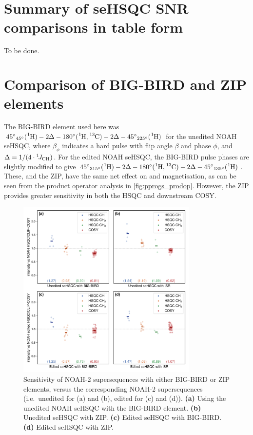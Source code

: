 \section{Summary of seHSQC SNR comparisons in table form}

To be done.

\section{Comparison of BIG-BIRD and ZIP elements}

The BIG-BIRD element used here was ${45^\circ}_{45^\circ}(\proton{}) - 2\Delta - 180^\circ(\proton{},\carbon{}) - 2\Delta - {45^\circ}_{225^\circ}(\proton{})$ for the unedited NOAH seHSQC, where $\beta_\phi$ indicates a hard pulse with flip angle $\beta$ and phase $\phi$, and $\Delta = 1/(4\cdot\onejch)$.
For the edited NOAH seHSQC, the BIG-BIRD pulse phases are slightly modified to give ${45^\circ}_{315^\circ}(\proton{}) - 2\Delta - 180^\circ(\proton{},\carbon{}) - 2\Delta - {45^\circ}_{135^\circ}(\proton{})$.
These, and the ZIP, have the same net effect on  and  magnetisation, as can be seen from the product operator analysis in \cref{fig:pprogs_prodop}.
However, the ZIP provides greater sensitivity in both the HSQC and downstream COSY.

\begin{figure}
    \centering
    \includegraphics[width=0.8\textwidth]{./figures/bigbird.png}
    \caption{
        Sensitivity of NOAH-2  supersequences with either BIG-BIRD or ZIP elements, versus the corresponding NOAH-2  supersequences (i.e.\ unedited for (a) and (b), edited for (c) and (d)).
        \textbf{(a)} Using the unedited NOAH seHSQC with the BIG-BIRD element.
        \textbf{(b)} Unedited seHSQC with ZIP.
        \textbf{(c)} Edited seHSQC with BIG-BIRD.
        \textbf{(d)} Edited seHSQC with ZIP.
        \andro{}
    }
    \label{fig:bigbird}
\end{figure}


